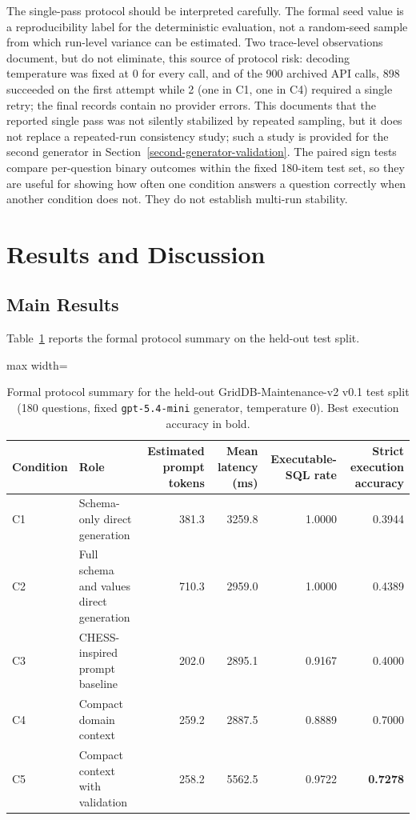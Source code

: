 \documentclass[cmc,article,submit,moreauthors,pdftex]{Definitions/tsp}
\begin{document}
The single-pass protocol should be interpreted carefully. The formal seed value is a reproducibility label for the deterministic evaluation, not a random-seed sample from which run-level variance can be estimated. Two trace-level observations document, but do not eliminate, this source of protocol risk: decoding temperature was fixed at 0 for every call, and of the 900 archived API calls, 898 succeeded on the first attempt while 2 (one in C1, one in C4) required a single retry; the final records contain no provider errors. This documents that the reported single pass was not silently stabilized by repeated sampling, but it does not replace a repeated-run consistency study; such a study is provided for the second generator in Section~\ref{second-generator-validation}. The paired sign tests compare per-question binary outcomes within the fixed 180-item test set, so they are useful for showing how often one condition answers a question correctly when another condition does not. They do not establish multi-run stability.

\section{Results and Discussion}\label{results}

\subsection{Main Results}\label{sect:r1}

Table~\ref{tab:main-results} reports the formal protocol summary on the held-out test split.

\begin{table}[H]
\tablesize{\small}
\caption{Formal protocol summary for the held-out GridDB-Maintenance-v2 v0.1 test split (180 questions, fixed \texttt{gpt-5.4-mini} generator, temperature 0). Best execution accuracy in bold.}
\label{tab:main-results}
\centering
\begin{adjustbox}{max width=\textwidth}
\begin{tabular}{llrrrr}
\toprule
\textbf{Condition} & \textbf{Role} & \textbf{Estimated prompt tokens} & \textbf{Mean latency (ms)} & \textbf{Executable-SQL rate} & \textbf{Strict execution accuracy} \\
\midrule
C1 & Schema-only direct generation & 381.3 & 3259.8 & 1.0000 & 0.3944 \\
C2 & Full schema and values direct generation & 710.3 & 2959.0 & 1.0000 & 0.4389 \\
C3 & CHESS-inspired prompt baseline & 202.0 & 2895.1 & 0.9167 & 0.4000 \\
C4 & Compact domain context & 259.2 & 2887.5 & 0.8889 & 0.7000 \\
C5 & Compact context with validation & 258.2 & 5562.5 & 0.9722 & \textbf{0.7278} \\
\bottomrule
\end{tabular}
\end{adjustbox}
\end{table}
\end{document}
